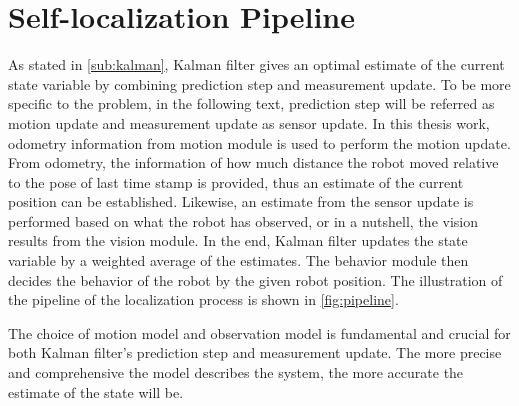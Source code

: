 \chapter{Self-localization Pipeline\label{cha:chapter4}}


As stated in \autoref{sub:kalman}, Kalman filter gives an optimal estimate of the current state variable by combining prediction step and measurement update. To be more specific to the problem, in the following text, prediction step will be referred as motion update and measurement update as sensor update. In this thesis work, odometry information from motion module is used to perform the motion update. From odometry, the information of how much distance the robot moved relative to the pose of last time stamp is provided, thus an estimate of the current position can be established. Likewise, an estimate from the sensor update is performed based on what the robot has observed, or in a nutshell, the vision results from the vision module. In the end, Kalman filter updates the state variable by a weighted average of the estimates. The behavior module then decides the behavior of the robot by the given robot position. The illustration of the pipeline of the localization process is shown in \autoref{fig:pipeline}.

The choice of motion model and observation model is fundamental and crucial for both Kalman filter's prediction step and measurement update. The more precise and comprehensive the model describes the system, the more accurate the estimate of the state will be. 

